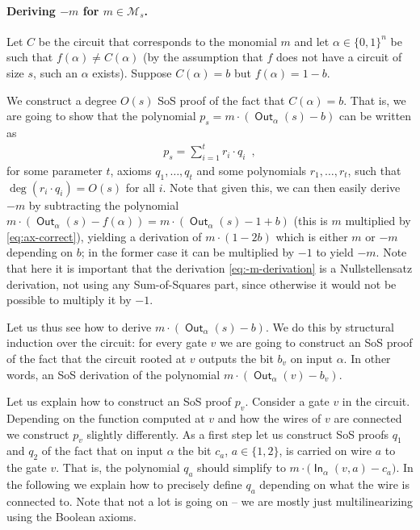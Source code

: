 \documentclass[10pt,a4paper]{article}
\theoremstyle{plain}
\theoremstyle{remark}
\theoremstyle{definition}
\newcommand{\eqcomma}{\enspace ,}
\newcommand{\set}[1]{\{#1\}}
\newcommand{\calM}{\mathcal{M}}
\newcommand{\vars}[1]{\mathsf{#1}}
\DeclareMathOperator{\outwire}{\vars{Out}}
\DeclareMathOperator{\inwire}{\vars{In}}
\begin{document}
\paragraph{Deriving $-m$ for $m \in \calM_s$.}
Let $C$ be the circuit that corresponds to the monomial $m$ and let
$\alpha \in \set{0,1}^n$ be such that $f(\alpha) \neq C(\alpha)$ (by
the assumption that $f$ does not have a circuit of size $s$, such an
$\alpha$ exists).  Suppose $C(\alpha) = b$ but $f(\alpha) = 1-b$.

We construct a degree $O(s)$ SoS proof of the fact that
$C(\alpha) = b$. That is, we are going to show that the polynomial
$p_s = m \cdot \left( \outwire_\alpha(s) - b\right)$ can be written as
\begin{align}
  \label{eq:-m-derivation}
  p_s = \sum_{i=1}^t r_i \cdot q_i \eqcomma
\end{align}
for some parameter $t$, axioms $q_1, \ldots, q_t$ and some polynomials
$r_1, \ldots, r_t$, such that $\deg(r_i \cdot q_i) = O(s)$ for all
$i$.  Note that given this, we can then easily derive $-m$ by
subtracting the polynomial
$m \cdot \left( \outwire_\alpha(s) - f(\alpha)\right) = m \cdot \left(
  \outwire_\alpha(s) - 1 + b\right)$ (this is $m$ multiplied by
\cref{eq:ax-correct}), yielding a derivation of $m \cdot (1 - 2b)$
which is either $m$ or $-m$ depending on $b$; in the former case it
can be multiplied by $-1$ to yield $-m$.  Note that here it is
important that the derivation \eqref{eq:-m-derivation} is a
Nullstellensatz derivation, not using any Sum-of-Squares part, since
otherwise it would not be possible to multiply it by $-1$.

Let us thus see how to derive $m \cdot \left( \outwire_\alpha(s) - b\right)$.
We do this by structural induction over the circuit: for every gate
$v$ we are going to construct an SoS proof of the fact that the
circuit rooted at $v$ outputs the bit $b_v$ on input $\alpha$. In
other words, an SoS derivation of the polynomial
$m \cdot \left(\outwire_\alpha(v) - b_v\right)$.


Let us explain how to construct an SoS proof $p_v$. Consider a gate
$v$ in the circuit. Depending on the function computed at $v$ and how
the wires of $v$ are connected we construct $p_v$ slightly differently.
As a first step let us construct SoS proofs $q_1$ and $q_2$ of the
fact that on input $\alpha$ the bit $c_a$, $a \in \set{1,2}$, is
carried on wire $a$ to the gate $v$. That is, the polynomial $q_a$
should simplify to $m \cdot \big(\inwire_\alpha(v, a) - c_a\big)$. In
the following we explain how to precisely define $q_a$ depending on
what the wire is connected to. Note that not a lot is going on -- we
are mostly just multilinearizing using the Boolean axioms.
\end{document}
